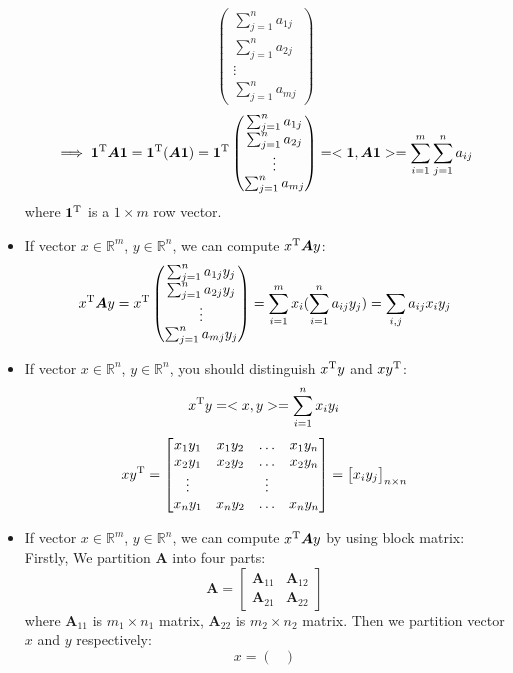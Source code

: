 \begin{itemize}
\[\begin{pmatrix}
\sum_{j=1}^{n}a_{1j}\\\sum_{j=1}^{n}a_{2j}\\\vdots\\\sum_{j=1}^{n}a_{mj}
\end{pmatrix}
\]
\[
\implies \bm 1^{\mathrm T}\bm A\bm 1 = \bm 1^{\mathrm T}(\bm A\bm 1) = \bm 1^{\mathrm T}\begin{pmatrix}
\sum_{j=1}^{n}a_{1j}\\\sum_{j=1}^{n}a_{2j}\\\vdots\\\sum_{j=1}^{n}a_{mj}
\end{pmatrix} = <\bm 1,\bm A\bm 1> = \sum_{i=1}^{m}\sum_{j=1}^{n}a_{ij}
\]
where $\bm 1^{\mathrm T}$ is a $1\times m$ row vector.
\item
If vector $x\in\mathbb{R}^{m}$, $y\in\mathbb{R}^{n}$, we can compute $x^{\mathrm T}\bm A y$:
\[
x^{\mathrm T}\bm A y = x^{\mathrm T}\begin{pmatrix}
\sum_{j=1}^{n}a_{1j}y_j\\\sum_{j=1}^{n}a_{2j}y_j\\\vdots\\\sum_{j=1}^{n}a_{mj}y_j
\end{pmatrix} = \sum_{i=1}^{m}x_i(\sum_{i=1}^{n}a_{ij}y_j) = \sum_{i,j}a_{ij}x_iy_j
\]
\item
If vector $x\in\mathbb{R}^{n}$, $y\in\mathbb{R}^{n}$, you should distinguish $x^{\mathrm T} y$ and $xy^{\mathrm T}$:
\[
x^{\mathrm T} y = <x,y> = \sum_{i=1}^{n}x_iy_i
\]
\[
xy^{\mathrm T} = \begin{bmatrix}
x_1y_1&x_1y_2&\ldots&x_1y_n\\
x_2y_1&x_2y_2&\ldots&x_2y_n\\
\vdots&&\vdots\\
x_ny_1&x_ny_2&\ldots&x_ny_n\\
\end{bmatrix} = \begin{bmatrix}
x_iy_j
\end{bmatrix}_{n\times n}
\]
\item
If vector $x\in\mathbb{R}^{m}$, $y\in\mathbb{R}^{n}$, we can compute $x^{\mathrm T}\bm A y$ by using block matrix:\\
Firstly, We partition $\bm A$ into four parts:
\[
\bm A = \begin{bmatrix}
\bm A_{11}&\bm A_{12}\\\bm A_{21}&\bm A_{22}
\end{bmatrix}
\]
where $\bm A_{11}$ is $m_1\times n_1$ matrix, $\bm A_{22}$ is $m_2\times n_2$ matrix.
Then we partition vector $x$ and $y$ respectively:
\[
x = \begin{pmatrix}

\end{pmatrix}\]
\end{itemize}
